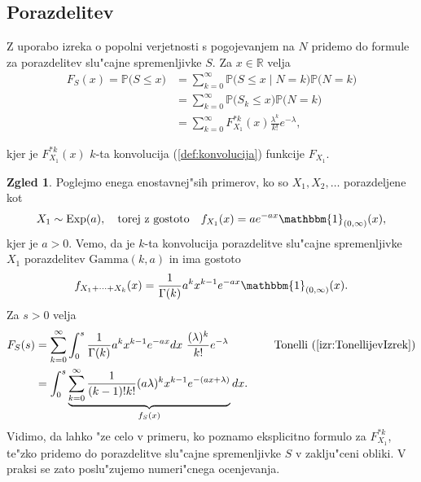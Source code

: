 \documentclass[12pt, a4paper, reqno]{amsart}
\theoremstyle{definition}
\newtheorem{zgled}[definicija]{Zgled}
\theoremstyle{plain}
\newcommand{\R}{\mathbb{R}}
\newcommand{\Prob}{\mathbb{P}}
\newcommand{\1}{\mathds{1}}
\begin{document}
    \subsection{Porazdelitev}
    Z uporabo izreka o popolni verjetnosti s pogojevanjem na $N$ pridemo do formule za 
    porazdelitev slu"cajne spremenljivke $S$. Za $x \in \R$ velja 
    \begin{align*}
        F_{S}(x) = \Prob\bigl(S \leq x\bigr) 
        &= \sum_{k=0}^\infty \Prob\bigl(S \leq x \mid N = k\bigr)\Prob\bigl(N = k\bigr) \\
        &= \sum_{k=0}^\infty \Prob\bigl(S_k \leq x\bigr)\Prob\bigl(N = k\bigr) \\
        &= \sum_{k=0}^\infty F_{X_1}^{*k}(x) \frac{\lambda^k}{k!} e^{-\lambda},
    \end{align*}

    \noindent
    kjer je $F_{X_1}^{*k}(x)$  $k$-ta konvolucija (\ref{def:konvolucija}) funkcije $F_{X_1}$.
    
    \begin{zgled}
        Poglejmo enega enostavnej"sih primerov, ko so $X_1, X_2, \dots$ porazdeljene kot
        \begin{equation*}
            X_1\sim\text{Exp}(a),\quad \text{torej z gostoto} \quad  f_{X_1}(x) = a e^{-a x}\mathbbm{1}_{(0, \infty)}(x),
        \end{equation*}
        kjer je $a>0$. Vemo, da je $k$-ta 
        konvolucija porazdelitve slu"cajne spremenljivke $X_1$ porazdelitev
         $\text{Gamma}(k, a)$ in ima gostoto
        \begin{equation*}
            f_{X_1 + \cdots + X_k}(x) = \frac{1}{\Gamma(k)}a^kx^{k-1}e^{-a x}\mathbbm{1}_{(0, \infty)}(x).
        \end{equation*}
        Za $s>0$ velja
        \begin{align*}
            F_{S}(s) 
            &= \sum_{k=0}^\infty \int_0^s\frac{1}{\Gamma(k)}a^kx^{k-1}e^{-ax}dx \ \frac{(\lambda )^k}{k!}e^{-\lambda }
            \qquad \qquad \text{Tonelli} \ (\ref{izr:TonellijevIzrek}) \\
            &= \int_0^s\underbrace{\sum_{k=0}^\infty \frac{1}{(k-1)!k!}(a\lambda)^kx^{k-1}e^{-(ax + \lambda)}}_{f_S(x)}dx.
        \end{align*}
        Vidimo, da lahko "ze celo v primeru, ko poznamo eksplicitno formulo za $F^{*k}_{X_1}$, te"zko pridemo do 
        porazdelitve slu"cajne spremenljivke $S$ v zaklju"ceni obliki. V praksi se zato poslu"zujemo numeri"cnega 
        ocenjevanja.
        \label{zgd:sestavljenaPoissonovaPorazdelitevGamma}
    \end{zgled}
\end{document}
